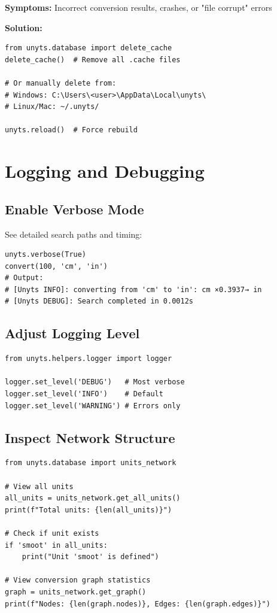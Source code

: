 \documentclass[11pt,a4paper]{report}
\begin{document}
\textbf{Symptoms:} Incorrect conversion results, crashes, or "file corrupt" errors

\textbf{Solution:}
\begin{lstlisting}[style=pythonstyle]
from unyts.database import delete_cache
delete_cache()  # Remove all .cache files

# Or manually delete from:
# Windows: C:\Users\<user>\AppData\Local\unyts\
# Linux/Mac: ~/.unyts/

unyts.reload()  # Force rebuild
\end{lstlisting}

\section{Logging and Debugging}

\subsection{Enable Verbose Mode}

See detailed search paths and timing:

\begin{lstlisting}[style=pythonstyle]
unyts.verbose(True)
convert(100, 'cm', 'in')
# Output:
# [Unyts INFO]: converting from 'cm' to 'in': cm ×0.3937→ in
# [Unyts DEBUG]: Search completed in 0.0012s
\end{lstlisting}

\subsection{Adjust Logging Level}

\begin{lstlisting}[style=pythonstyle]
from unyts.helpers.logger import logger

logger.set_level('DEBUG')   # Most verbose
logger.set_level('INFO')    # Default
logger.set_level('WARNING') # Errors only
\end{lstlisting}

\subsection{Inspect Network Structure}

\begin{lstlisting}[style=pythonstyle]
from unyts.database import units_network

# View all units
all_units = units_network.get_all_units()
print(f"Total units: {len(all_units)}")

# Check if unit exists
if 'smoot' in all_units:
    print("Unit 'smoot' is defined")

# View conversion graph statistics
graph = units_network.get_graph()
print(f"Nodes: {len(graph.nodes)}, Edges: {len(graph.edges)}")
\end{lstlisting}
\end{document}
